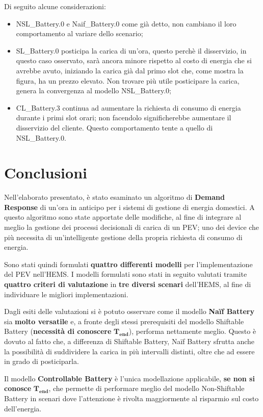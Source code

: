 \documentclass[italian, Lau, oneside]{sapthesis}
\begin{document}
Di seguito alcune considerazioni:
\begin{itemize}
    \item NSL\_Battery.0 e Naif\_Battery.0 come già detto, non cambiano il loro comportamento al variare dello scenario;
    \item SL\_Battery.0 posticipa la carica di un'ora, questo perchè il disservizio, in questo caso osservato, sarà ancora minore rispetto al costo di energia che si avrebbe avuto, iniziando la carica già dal primo slot che, come mostra la figura, ha un prezzo elevato. Non trovare più utile posticipare la carica, genera la convergenza al modello NSL\_Battery.0;
    \item CL\_Battery.3 continua ad aumentare la richiesta di consumo di energia durante i primi slot orari; non facendolo significherebbe aumentare il disservizio del cliente. Questo comportamento tente a quello di NSL\_Battery.0.
\end{itemize}




\chapter{Conclusioni}
\label{cap:7}
Nell'elaborato presentato, è stato esaminato un algoritmo di \textbf{Demand Response} di un'ora in anticipo per i sistemi di gestione di energia domestici. A questo algoritmo sono state apportate delle modifiche, al fine di integrare al meglio la gestione dei processi decisionali di carica di un PEV; uno dei device che più necessita di un'intelligente gestione della propria richiesta di consumo di energia. 

Sono stati quindi formulati \textbf{quattro differenti modelli} per l'implementazione del PEV nell'HEMS. I modelli formulati sono stati in seguito valutati tramite \textbf{quattro criteri di valutazione} in \textbf{tre diversi scenari} dell'HEMS, al fine di individuare le migliori implementazioni.

Dagli esiti delle valutazioni si è potuto osservare come il modello \textbf{Naïf Battery} sia \textbf{molto versatile} e, a fronte degli stessi prerequisiti del modello Shiftable Battery (\textbf{necessità di conoscere} $\mathbf{T_{end}}$), performa nettamente meglio. Questo è dovuto al fatto che, a differenza di Shiftable Battery, Naïf Battery sfrutta anche la possibilità di suddividere la carica in più intervalli distinti, oltre che ad essere in grado di posticiparla. 

Il modello \textbf{Controllable Battery} è l'unica modellazione applicabile, \textbf{se non si conosce} $\mathbf{T_{end}}$, che permette di performare meglio del modello Non-Shiftable Battery in scenari dove l'attenzione è rivolta maggiormente al risparmio sul costo dell'energia.
\end{document}
